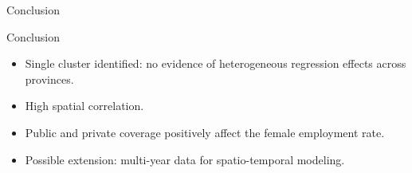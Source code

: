 \begin{section}{Conclusion}

\begin{frame}{Conclusion}
\begin{itemize}
    
    \item Single cluster identified: no evidence of heterogeneous regression effects across provinces.
    
    \item High spatial correlation. 
    
    \item Public and private coverage positively affect the female employment rate.
    
    \item Possible extension: multi-year data for spatio-temporal modeling.
\end{itemize}
    
\end{frame}

\end{section}